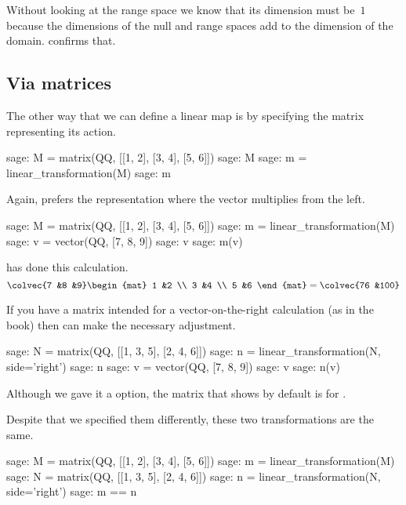 Without looking at the range space we know that its dimension must be~$1$ 
because the dimensions of the null and range spaces add to
the dimension of the domain.
\Sage{} confirms that.



\subsection{Via matrices}
The other way that we can define a linear map is by specifying 
the matrix representing its action.
\begin{sagecommandline}
sage: M = matrix(QQ, [[1, 2], [3, 4], [5, 6]])
sage: M
sage: m = linear_transformation(M)
sage: m  
\end{sagecommandline}
Again, \Sage{} prefers the 
representation where the vector multiplies
from the left.
\begin{sagecommandline}
sage: M = matrix(QQ, [[1, 2], [3, 4], [5, 6]])
sage: m = linear_transformation(M)
sage: v = vector(QQ, [7, 8, 9])
sage: v
sage: m(v)  
\end{sagecommandline}
\Sage{} has done this calculation.
\begin{equation*}
  \colvec{7 &8 &9}
  \begin{mat}
    1 &2 \\
    3 &4 \\
    5 &6
  \end{mat}
  =\colvec{76 &100}
\end{equation*}

If you have a matrix intended for a vector-on-the-right
calculation (as in the book) then \Sage{} can make the necessary adjustment.
\begin{sagecommandline}
sage: N = matrix(QQ, [[1, 3, 5], [2, 4, 6]])
sage: n = linear_transformation(N, side='right')
sage: n
sage: v = vector(QQ, [7, 8, 9])
sage: v
sage: n(v)  
\end{sagecommandline}
\noindent Although we gave it a  option, 
the matrix that \Sage{} shows by default is for 
.

Despite that we specified them differently, 
these two transformations are the same.
\begin{sagecommandline}
sage: M = matrix(QQ, [[1, 2], [3, 4], [5, 6]])
sage: m = linear_transformation(M)
sage: N = matrix(QQ, [[1, 3, 5], [2, 4, 6]])
sage: n = linear_transformation(N, side='right')
sage: m == n  
\end{sagecommandline}

